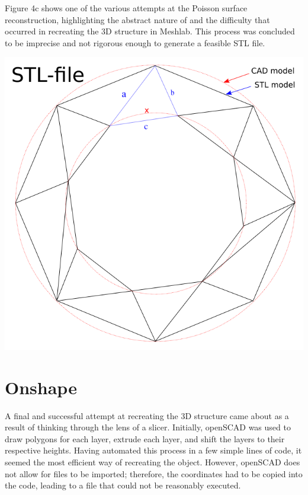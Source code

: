 \documentclass[11pt, A4paper]{article}
\begin{document}
\begin{multicols}{2}
    \small{}
    \label{fig:meshlab}
        \bigskip
\endgroup

Figure 4c shows one of the various attempts at the Poisson surface reconstruction, highlighting the abstract nature of and the difficulty that occurred in recreating the 3D structure in Meshlab. This process was concluded to be imprecise and not rigorous enough to generate a feasible STL file.

\begingroup
    \centering
    \includegraphics[width=\columnwidth]{cad-vs-stl}
    \small{}
    \label{fig:explainSTL}
\endgroup

\section{Onshape}

A final and successful attempt at recreating the 3D structure came about as a result of thinking through the lens of a slicer. Initially, openSCAD was used to draw polygons for each layer, extrude each layer, and shift the layers to their respective heights. Having automated this process in a few simple lines of code, it seemed the most efficient way of recreating the object. However, openSCAD does not allow for files to be imported; therefore, the coordinates had to be copied into the code, leading to a file that could not be reasonably executed. 


\end{multicols}
\end{document}
